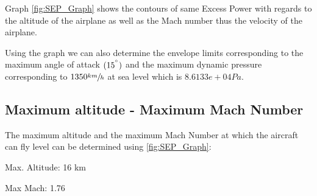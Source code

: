 Graph \ref{fig:SEP_Graph} shows the contours of same Excess Power with regards to
the altitude of the airplane as well as the Mach number thus the velocity of the airplane.

Using the graph we can also determine the envelope limits corresponding to the maximum angle of attack
$(15^{\degree})$ and the maximum dynamic pressure corresponding to $1350 \sfrac{km}{h}$ at sea level which 
is $8.6133e+04 Pa$.

\subsection{Maximum altitude - Maximum Mach Number}
The maximum altitude and the maximum Mach Number at which the aircraft can fly level 
can be determined using \ref{fig:SEP_Graph}:

\begin{itemize*}
    \item Max. Altitude: 16 km
    \item Max Mach: 1.76
\end{itemize*}
